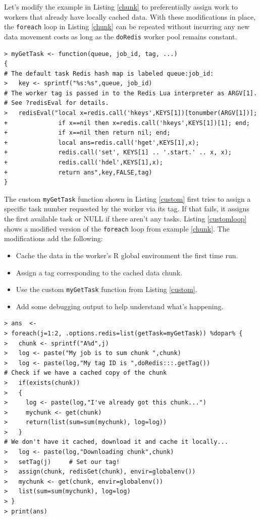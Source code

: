 \documentclass[12pt]{article}
\newenvironment{mitemize}{
\begin{itemize}
  \setlength{\itemsep}{1pt}
  \setlength{\parskip}{0pt}
  \setlength{\parsep}{0pt}
}{\end{itemize}}
\begin{document}
Let's modify the example in Listing \ref{chunk} to preferentially assign work
to workers that already have locally cached data.  With these modifications in
place, the \verb+foreach+ loop in Listing \ref{chunk} can be repeated without
incurring any new data movement costs as long as the \verb+doRedis+ worker pool
remains constant.

\begin{lstlisting}[float=!ht,caption=Custom getTask function,basicstyle=\footnotesize\ttfamily,label=custom]
> myGetTask <- function(queue, job_id, tag, ...)
{ 
# The default task Redis hash map is labeled queue:job_id:
>   key <- sprintf("%s:%s",queue, job_id)
# The worker tag is passed in to the Redis Lua interpreter as ARGV[1].
# See ?redisEval for details.
>   redisEval("local x=redis.call('hkeys',KEYS[1])[tonumber(ARGV[1])];
+              if x==nil then x=redis.call('hkeys',KEYS[1])[1]; end;
+              if x==nil then return nil; end;
+              local ans=redis.call('hget',KEYS[1],x);
+              redis.call('set', KEYS[1] .. '.start.' .. x, x);
+              redis.call('hdel',KEYS[1],x);
+              return ans",key,FALSE,tag)
}
\end{lstlisting}

The custom \verb+myGetTask+ function shown in Listing \ref{custom} first tries
to assign a specific task number requested by the worker via its tag. If that
fails, it assigns the first available task or NULL if there aren't any tasks.
Listing \ref{customloop} shows a modified version of the \verb+foreach+ loop
from example \ref{chunk}. The modifications add the following:
\begin{mitemize}
\item Cache the data in the worker's R global environment the first time run.
\item Assign a tag corresponding to the cached data chunk.
\item Use the custom \verb+myGetTask+ function from Listing \ref{custom}.
\item Add some debugging output to help understand what's happening.
\end{mitemize}

\begin{lstlisting}[float=!ht,caption=Modified foreach loop,basicstyle=\footnotesize\ttfamily,label=customloop]
> ans  <-
> foreach(j=1:2, .options.redis=list(getTask=myGetTask)) %dopar% {
>   chunk <- sprintf("A%d",j)
>   log <- paste("My job is to sum chunk ",chunk)
>   log <- paste(log,"My tag ID is ",doRedis:::.getTag())
# Check if we have a cached copy of the chunk
>   if(exists(chunk))
>   {
>     log <- paste(log,"I've already got this chunk...")
>     mychunk <- get(chunk)
>     return(list(sum=sum(mychunk), log=log))
>   }
# We don't have it cached, download it and cache it locally...
>   log <- paste(log,"Downloading chunk",chunk)
>   setTag(j)     # Set our tag!
>   assign(chunk, redisGet(chunk), envir=globalenv())
>   mychunk <- get(chunk, envir=globalenv())
>   list(sum=sum(mychunk), log=log)
> }
> print(ans)
\end{lstlisting}
\end{document}
